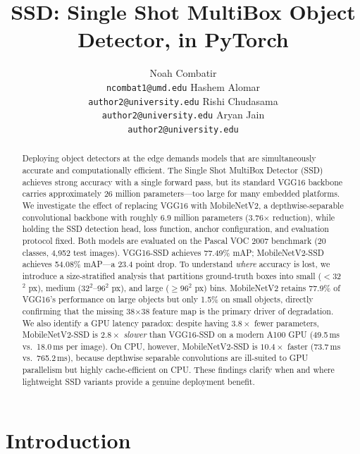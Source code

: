 \documentclass{article}
\title{SSD: Single Shot MultiBox Object Detector, in PyTorch}
\author{%
  Noah Combatir \\
  \texttt{ncombat1@umd.edu}
  \And
  Hashem Alomar \\
  \texttt{author2@university.edu}
  \And
  Rishi Chudasama \\
  \texttt{author2@university.edu}
  \And
  Aryan Jain \\
  \texttt{author2@university.edu}
}
\begin{document}

\maketitle

\begin{abstract}
  Deploying object detectors at the edge demands models that are simultaneously accurate and computationally efficient. The Single Shot MultiBox Detector (SSD) achieves strong accuracy with a single forward pass, but its standard VGG16 backbone carries approximately 26 million parameters—too large for many embedded platforms. We investigate the effect of replacing VGG16 with MobileNetV2, a depthwise-separable convolutional backbone with roughly 6.9 million parameters (3.76$\times$ reduction), while holding the SSD detection head, loss function, anchor configuration, and evaluation protocol fixed. Both models are evaluated on the Pascal VOC 2007 benchmark (20 classes, 4,952 test images). VGG16-SSD achieves 77.49\% mAP; MobileNetV2-SSD achieves 54.08\% mAP—a 23.4 point drop. To understand \emph{where} accuracy is lost, we introduce a size-stratified analysis that partitions ground-truth boxes into small ($<$32$^2$ px), medium (32$^2$–96$^2$ px), and large ($\geq$96$^2$ px) bins. MobileNetV2 retains 77.9\% of VGG16's performance on large objects but only 1.5\% on small objects, directly confirming that the missing 38$\times$38 feature map is the primary driver of degradation. We also identify a GPU latency paradox: despite having $3.8\times$ fewer parameters, MobileNetV2-SSD is $2.8\times$ \emph{slower} than VGG16-SSD on a modern A100 GPU (49.5\,ms vs.\ 18.0\,ms per image). On CPU, however, MobileNetV2-SSD is $10.4\times$ faster (73.7\,ms vs.\ 765.2\,ms), because depthwise separable convolutions are ill-suited to GPU parallelism but highly cache-efficient on CPU. These findings clarify when and where lightweight SSD variants provide a genuine deployment benefit.
\end{abstract}

\section{Introduction}
\label{sec:intro}
\end{document}
